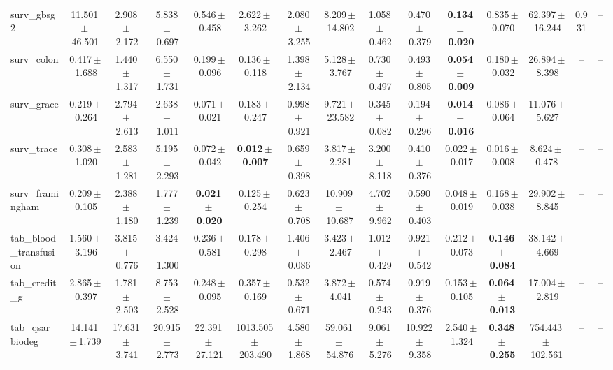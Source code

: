\documentclass[8pt]{extarticle}
\begin{document}
\begin{longtable}{l*{14}{c}}
surv\_gbsg2 & 11.501\,$\pm$\,46.501 & 2.908\,$\pm$\,2.172 & 5.838\,$\pm$\,0.697 & 0.546\,$\pm$\,0.458 & 2.622\,$\pm$\,3.262 & 2.080\,$\pm$\,3.255 & 8.209\,$\pm$\,14.802 & 1.058\,$\pm$\,0.462 & 0.470\,$\pm$\,0.379 & \textbf{0.134\,$\pm$\,0.020} & 0.835\,$\pm$\,0.070 & 62.397\,$\pm$\,16.244 & 0.931 & -- \\
surv\_colon & 0.417\,$\pm$\,1.688 & 1.440\,$\pm$\,1.317 & 6.550\,$\pm$\,1.731 & 0.199\,$\pm$\,0.096 & 0.136\,$\pm$\,0.118 & 1.398\,$\pm$\,2.134 & 5.128\,$\pm$\,3.767 & 0.730\,$\pm$\,0.497 & 0.493\,$\pm$\,0.805 & \textbf{0.054\,$\pm$\,0.009} & 0.180\,$\pm$\,0.032 & 26.894\,$\pm$\,8.398 & -- & -- \\
surv\_grace & 0.219\,$\pm$\,0.264 & 2.794\,$\pm$\,2.613 & 2.638\,$\pm$\,1.011 & 0.071\,$\pm$\,0.021 & 0.183\,$\pm$\,0.247 & 0.998\,$\pm$\,0.921 & 9.721\,$\pm$\,23.582 & 0.345\,$\pm$\,0.082 & 0.194\,$\pm$\,0.296 & \textbf{0.014\,$\pm$\,0.016} & 0.086\,$\pm$\,0.064 & 11.076\,$\pm$\,5.627 & -- & -- \\
surv\_trace & 0.308\,$\pm$\,1.020 & 2.583\,$\pm$\,1.281 & 5.195\,$\pm$\,2.293 & 0.072\,$\pm$\,0.042 & \textbf{0.012\,$\pm$\,0.007} & 0.659\,$\pm$\,0.398 & 3.817\,$\pm$\,2.281 & 3.200\,$\pm$\,8.118 & 0.410\,$\pm$\,0.376 & 0.022\,$\pm$\,0.017 & 0.016\,$\pm$\,0.008 & 8.624\,$\pm$\,0.478 & -- & -- \\
surv\_framingham & 0.209\,$\pm$\,0.105 & 2.388\,$\pm$\,1.180 & 1.777\,$\pm$\,1.239 & \textbf{0.021\,$\pm$\,0.020} & 0.125\,$\pm$\,0.254 & 0.623\,$\pm$\,0.708 & 10.909\,$\pm$\,10.687 & 4.702\,$\pm$\,9.962 & 0.590\,$\pm$\,0.403 & 0.048\,$\pm$\,0.019 & 0.168\,$\pm$\,0.038 & 29.902\,$\pm$\,8.845 & -- & -- \\
tab\_blood\_transfusion & 1.560\,$\pm$\,3.196 & 3.815\,$\pm$\,0.776 & 3.424\,$\pm$\,1.300 & 0.236\,$\pm$\,0.581 & 0.178\,$\pm$\,0.298 & 1.406\,$\pm$\,0.086 & 3.423\,$\pm$\,2.467 & 1.012\,$\pm$\,0.429 & 0.921\,$\pm$\,0.542 & 0.212\,$\pm$\,0.073 & \textbf{0.146\,$\pm$\,0.084} & 38.142\,$\pm$\,4.669 & -- & -- \\
tab\_credit\_g & 2.865\,$\pm$\,0.397 & 1.781\,$\pm$\,2.503 & 8.753\,$\pm$\,2.528 & 0.248\,$\pm$\,0.095 & 0.357\,$\pm$\,0.169 & 0.532\,$\pm$\,0.671 & 3.872\,$\pm$\,4.041 & 0.574\,$\pm$\,0.243 & 0.919\,$\pm$\,0.376 & 0.153\,$\pm$\,0.105 & \textbf{0.064\,$\pm$\,0.013} & 17.004\,$\pm$\,2.819 & -- & -- \\
tab\_qsar\_biodeg & 14.141\,$\pm$\,1.739 & 17.631\,$\pm$\,3.741 & 20.915\,$\pm$\,2.773 & 22.391\,$\pm$\,27.121 & 1013.505\,$\pm$\,203.490 & 4.580\,$\pm$\,1.868 & 59.061\,$\pm$\,54.876 & 9.061\,$\pm$\,5.276 & 10.922\,$\pm$\,9.358 & 2.540\,$\pm$\,1.324 & \textbf{0.348\,$\pm$\,0.255} & 754.443\,$\pm$\,102.561 & -- & -- \\

\end{longtable}
\end{document}
